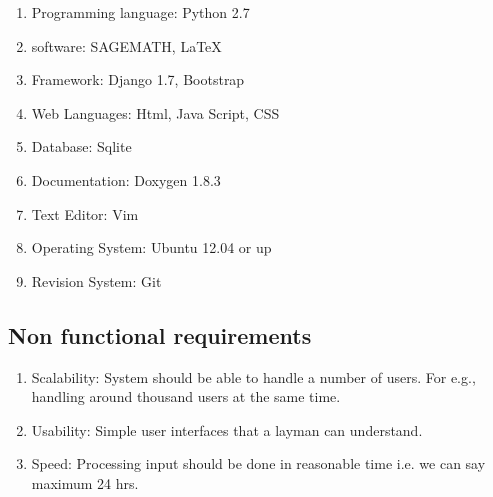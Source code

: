 \begin{itemize}
\begin{enumerate} 
\item Programming language: Python 2.7
\item software: SAGEMATH, \LaTeX{}
\item Framework: Django 1.7, Bootstrap
\item Web Languages: Html, Java Script, CSS
\item Database: Sqlite 
\item Documentation: Doxygen 1.8.3
\item Text Editor: Vim
\item Operating System: Ubuntu 12.04 or up
\item Revision System: Git

\end{enumerate}
\vskip 0.5cm
\subsection{Non functional requirements}
\begin{enumerate} 
\item Scalability: System should be able to handle a number of users. 
For e.g., handling around thousand users at the same time.
\item Usability: Simple user interfaces that a layman can understand.
\item Speed: Processing input should be done in reasonable time
 i.e. we can say maximum 24 hrs.
\end{enumerate}
\end{itemize}



